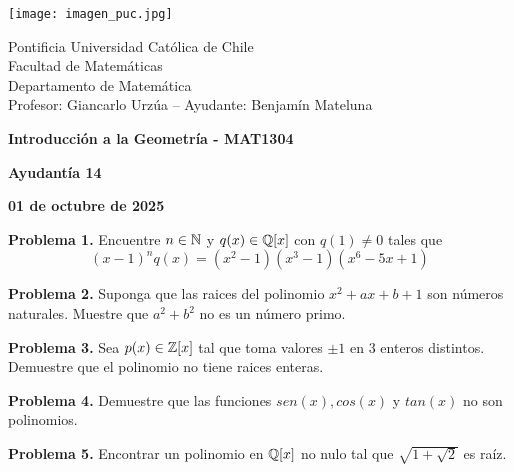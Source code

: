 \documentclass{article}
\begin{document}
\begin{minipage}{2.5cm}
    \texttt{[image: imagen\_puc.jpg]}
\end{minipage}
\begin{minipage}{14cm}
    {\sc Pontificia Universidad Católica de Chile\\
    Facultad de Matemáticas\\
    Departamento de Matemática\\
    Profesor: Giancarlo Urzúa -- Ayudante: Benjamín Mateluna}
\end{minipage}
\vspace{1ex}

{\centerline{\bf Introducción a la Geometría - MAT1304}
\centerline{\bf Ayudantía 14}}
\centerline{\bf 01 de octubre de 2025}

\vspace{1cm}
\noindent\textbf{Problema 1.} Encuentre $n\in\mathbb{N}$ y $q(x)\in\mathbb{Q}[x]$ con $q(1)\neq0$ tales que
\begin{equation*}
    (x-1)^{n}q(x)=(x^{2}-1)(x^{3}-1)(x^{6}-5x+1)
\end{equation*}

\vspace{5mm}
\noindent\textbf{Problema 2.} Suponga que las raices del polinomio $x^{2}+ax+b+1$ son números 
naturales. Muestre que $a^{2}+b^{2}$ no es un número primo.

\vspace{5mm}
\noindent\textbf{Problema 3.} Sea $p(x)\in\mathbb{Z}[x]$ tal que toma valores $\pm1$ en $3$ enteros 
distintos. Demuestre que el polinomio no tiene raices enteras.

\vspace{5mm}
\noindent\textbf{Problema 4.} Demuestre que las funciones $sen(x),cos(x)$ y $tan(x)$ no son 
polinomios.

\vspace{5mm}
\noindent\textbf{Problema 5.} Encontrar un polinomio en $\mathbb{Q}[x]$ no nulo tal que 
$\sqrt{1+\sqrt{2}}$ es raíz.

\end{document}
